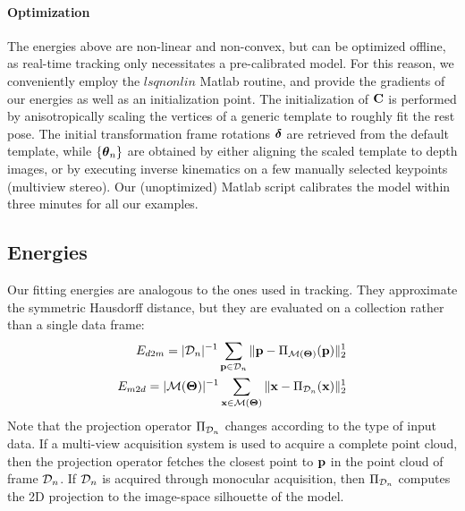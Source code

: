 
\paragraph{Optimization}
The energies above are non-linear and non-convex, but can be optimized offline, as real-time tracking only necessitates a pre-calibrated model. For this reason, we conveniently employ the $lsqnonlin$ Matlab routine, and provide the gradients of our energies as well as an initialization point.
The initialization of ${\mathbf{C}}$ is performed  by anisotropically scaling the vertices of a generic template to roughly fit the rest pose. The initial transformation frame rotations $\boldsymbol{\delta}$ are retrieved from the default template, while ${\{\boldsymbol{\theta}_n\}}$ are obtained by either aligning the scaled template to depth images, or by executing inverse kinematics on a few manually selected keypoints (multiview stereo).
Our (unoptimized) Matlab script calibrates the model within three minutes for all our examples.


\subsection{Energies}
Our fitting energies are analogous to the ones used in tracking. They approximate the symmetric Hausdorff distance, but they are evaluated on a collection rather than a single data frame:
% 
\begin{eqnarray}
E_{d2m} = |\mathcal{D}_n|^{-1} \sum_{\mathbf{p} \in \mathcal{D}_n} \| \mathbf{p} - \Pi_{\mathcal{M}(\boldsymbol{\Theta})}(\mathbf{p})\|_2^1 \\
E_{m2d} = |\mathcal{M}(\boldsymbol{\Theta})|^{-1} \sum_{\mathbf{x} \in \mathcal{M}(\boldsymbol{\Theta})} \| \mathbf{x} - \Pi_{\mathcal{D}_n}(\mathbf{x})\|_2^1
\end{eqnarray}
% 
Note that the projection operator $\Pi_{\mathcal{D}_n}$ changes according to the type of input data. If a multi-view acquisition system is used to acquire a complete point cloud, then the projection operator fetches the closest point to $\mathbf{p}$ in the point cloud of frame $\mathcal{D}_n$. If $\mathcal{D}_n$ is acquired through monocular acquisition, then $\Pi_{\mathcal{D}_n}$ computes the 2D projection to the image-space silhouette of the model.

